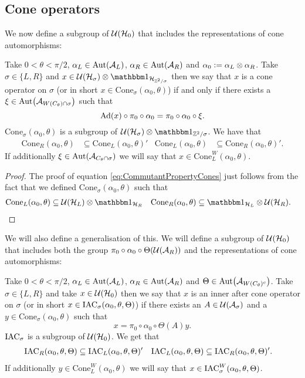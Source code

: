 \documentclass[11pt,a4paper,twoside]{article}
\numberwithin{equation}{section}
\begin{document}
\subsection{Cone operators}
 We now define a subgroup of $\mathcal U(\mathcal H_0)$ that includes the representations of cone automorphisms:
\begin{definition}\label{def:ConeOperators}
	Take $0<\theta<\pi/2$, $\alpha_L\in\Aut{\AA_{L}}$, $\alpha_R\in\Aut{\AA_{R}}$ and $\alpha_0\vcentcolon= \alpha_L\otimes\alpha_R$. Take $\sigma\in\{L,R\}$ and $x\in\UU(\HH_{\sigma})\otimes\id_{\HH_{\ZZ^2/\sigma}}$ then we say that $x$ is a cone operator on $\sigma$ (or in short $x\in\textrm{Cone}_{\sigma}(\alpha_0,\theta)$) if and only if there exists a $\xi\in\Aut{\AA_{W(C_\theta)\cap\sigma}}$ such that
	\begin{equation}
		\Ad{x}\circ\pi_0\circ\alpha_0=\pi_0\circ\alpha_0\circ\xi.
	\end{equation}
	$\textrm{Cone}_\sigma(\alpha_0,\theta)$ is a subgroup of $\UU(\HH_\sigma)\otimes\id_{\ZZ^2/\sigma}$. We have that
	\begin{align}\label{eq:CommutantPropertyCones}
		\textrm{Cone}_R(\alpha_0,\theta)&\subseteq\textrm{Cone}_L(\alpha_0,\theta)'&\textrm{Cone}_L(\alpha_0,\theta)&\subseteq\textrm{Cone}_R(\alpha_0,\theta)'.
	\end{align}
	If additionally $\xi\in\Aut{\AA_{C_\theta\cap\sigma}}$ we will say that $x\in\textrm{Cone}_L^W(\alpha_0,\theta)$.
\end{definition}
\begin{proof}
	The proof of equation \eqref{eq:CommutantPropertyCones} just follows from the fact that we defined $\textrm{Cone}_\sigma(\alpha_0,\theta)$ such that
	\begin{align}
		\textrm{Cone}_L(\alpha_0,\theta)&\subseteq \UU(\HH_L)\otimes\id_{\HH_R}&\textrm{Cone}_R(\alpha_0,\theta)&\subseteq \id_{\HH_L} \otimes \UU(\HH_R).
	\end{align}
\end{proof}
We will also define a generalisation of this. We will define a subgroup of $\mathcal U(\mathcal H_0)$ that includes both the group $\pi_0\circ\alpha_0\circ\Theta(\mathcal U(\mathcal A_R))$ and the representations of cone automorphisms:
\begin{definition}
	Take $0<\theta<\pi/2$, $\alpha_L\in\Aut{\AA_{L}}$, $\alpha_R\in\Aut{\AA_{R}}$ and $\Theta\in\Aut{\AA_{W(C_\theta)^c}}$. Take $\sigma\in\{L,R\}$ and take $x\in\mathcal U(\mathcal H_0)$ then we say that $x$ is an inner after cone operator on $\sigma$ (or in short $x\in \textrm{IAC}_\sigma(\alpha_0,\theta,\Theta)$) if there exists an $A\in\mathcal U(\mathcal A_\sigma)$ and a $y\in\textrm{Cone}_\sigma(\alpha_0,\theta)$ such that
	\begin{equation}
		x=\pi_0\circ\alpha_0\circ\Theta(A)y.
	\end{equation}
	$\textrm{IAC}_\sigma$ is a subgroup of $\mathcal U(\mathcal H_0)$. We get that
	\begin{align}\label{eq:CommutantProperty}
		\textrm{IAC}_R(\alpha_0,\theta,\Theta)&\subseteq\textrm{IAC}_L(\alpha_0,\theta,\Theta)'&\textrm{IAC}_L(\alpha_0,\theta,\Theta)&\subseteq\textrm{IAC}_R(\alpha_0,\theta,\Theta)'.
	\end{align}
	If additionally $y\in \textrm{Cone}_L^W(\alpha_0,\theta)$ we will say that $x\in \textrm{IAC}_\sigma^W(\alpha_0,\theta,\Theta)$.
\end{definition}
\end{document}
